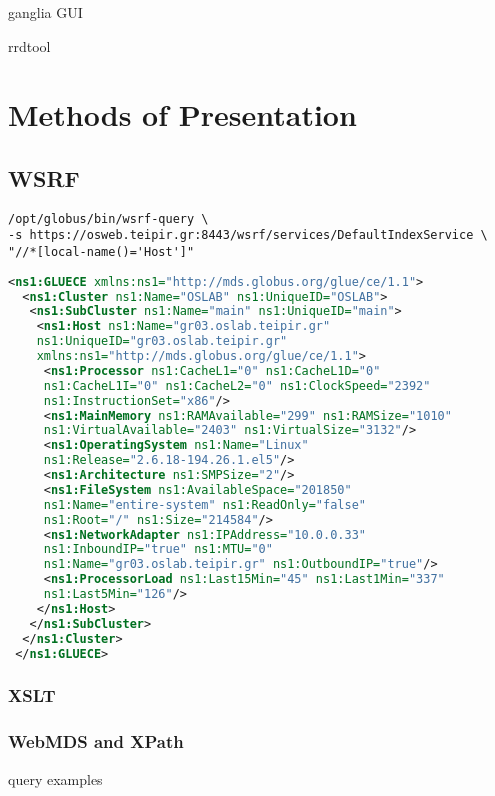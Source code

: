 ganglia GUI

rrdtool
\newpage

\section{Methods of Presentation}


\subsection{WSRF}
\begin{verbatim}
/opt/globus/bin/wsrf-query \
-s https://osweb.teipir.gr:8443/wsrf/services/DefaultIndexService \
"//*[local-name()='Host']"
\end{verbatim}


\begin{lstlisting}[language=XML,caption=WSRF query output]
 <ns1:GLUECE xmlns:ns1="http://mds.globus.org/glue/ce/1.1">
  <ns1:Cluster ns1:Name="OSLAB" ns1:UniqueID="OSLAB">
   <ns1:SubCluster ns1:Name="main" ns1:UniqueID="main">
    <ns1:Host ns1:Name="gr03.oslab.teipir.gr" 
    ns1:UniqueID="gr03.oslab.teipir.gr" 
    xmlns:ns1="http://mds.globus.org/glue/ce/1.1">
     <ns1:Processor ns1:CacheL1="0" ns1:CacheL1D="0" 
     ns1:CacheL1I="0" ns1:CacheL2="0" ns1:ClockSpeed="2392" 
     ns1:InstructionSet="x86"/>
     <ns1:MainMemory ns1:RAMAvailable="299" ns1:RAMSize="1010" 
     ns1:VirtualAvailable="2403" ns1:VirtualSize="3132"/>
     <ns1:OperatingSystem ns1:Name="Linux"
     ns1:Release="2.6.18-194.26.1.el5"/>
     <ns1:Architecture ns1:SMPSize="2"/>
     <ns1:FileSystem ns1:AvailableSpace="201850" 
     ns1:Name="entire-system" ns1:ReadOnly="false"
     ns1:Root="/" ns1:Size="214584"/>
     <ns1:NetworkAdapter ns1:IPAddress="10.0.0.33" 
     ns1:InboundIP="true" ns1:MTU="0" 
     ns1:Name="gr03.oslab.teipir.gr" ns1:OutboundIP="true"/>
     <ns1:ProcessorLoad ns1:Last15Min="45" ns1:Last1Min="337"
     ns1:Last5Min="126"/>
    </ns1:Host>
   </ns1:SubCluster>
  </ns1:Cluster>
 </ns1:GLUECE>
\end{lstlisting}

\subsubsection{XSLT}
\newpage

\subsubsection{WebMDS and XPath}
query examples

